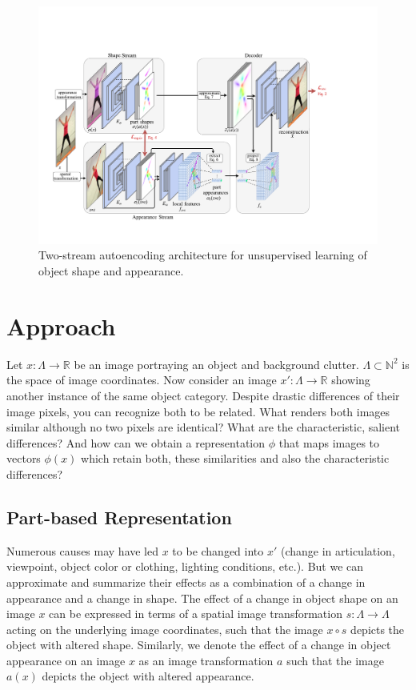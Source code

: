 %
\begin{figure}[ht!]
    \centering
    \includegraphics[trim={2cm 3cm 7cm 7cm},clip, width=0.97\linewidth]{fig/architecture_final.pdf}
	\caption{Two-stream autoencoding architecture for unsupervised learning of object shape and appearance.} %
    \label{fig:architecture}
\end{figure}
%
\section{Approach}
    Let $x: \Lambda \rightarrow \mathbb{R}$ be an image portraying an object and background clutter. $\Lambda \subset \mathbb{N}^2$ is the space of image coordinates. Now consider an image $x': \Lambda \rightarrow \mathbb{R}$ showing another instance of the same object category. Despite drastic differences of their image pixels, you can recognize both to be related. What renders both images similar although no two pixels are identical? What are the characteristic, salient differences? And how can we obtain a representation $\phi$ that maps images to vectors $\phi(x)$ which retain both, these similarities and also the characteristic differences?
\subsection{Part-based Representation}
    Numerous causes may have led $x$ to be changed into $x'$ (change in articulation, viewpoint, object color or clothing, lighting conditions, %
    etc.). But we can approximate and summarize their effects as a combination of a change in appearance and a change in shape.
    The effect of a change in object shape on an image $x$ can be expressed in terms of a spatial image transformation  $s: \Lambda \rightarrow \Lambda$ acting on the underlying image coordinates, such that the image $x {\circ} s$ depicts the object with altered shape.
    Similarly, we denote the effect of a change in object appearance on an image $x$ as an image transformation $a$ such that the image $a(x)$ depicts the object with altered appearance.

